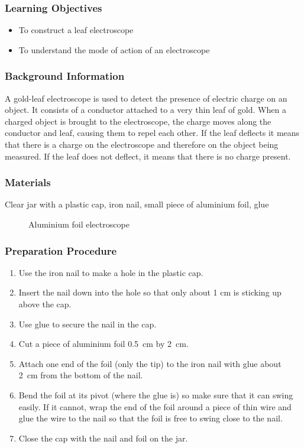 \subsubsection*{Learning Objectives}
\begin{itemize}
\item{To construct a leaf electroscope} 
\item{To understand the mode of action of an electroscope} 
\end{itemize}

\subsubsection*{Background Information}
A gold-leaf electroscope is used to detect the presence of electric charge on an object. It consists of a conductor attached to a very thin leaf of gold. When a charged object is brought to the electroscope, the charge moves along the conductor and leaf, causing them to repel each other. If the leaf deflects it means that there is a charge on the electroscope and therefore on the object being measured. If the leaf does not deflect, it means that there is no charge present. 

\subsubsection*{Materials}
Clear jar with a plastic cap, iron nail, small piece of aluminium foil, glue

\begin{figure}[h!]
\begin{center}
\def\svgwidth{200pt}

\caption{Aluminium foil electroscope}
\label{fig:al-leaf-electroscope}
\end{center}
\end{figure}

\subsubsection*{Preparation Procedure}
\begin{enumerate}
\item{Use the iron nail to make a hole in the plastic cap.} 
\item{Insert the nail down into the hole so that only about 1 cm is sticking up above the cap.} 
\item{Use glue to secure the nail in the cap.} 
\item{Cut a piece of aluminium foil 0.5~cm by 2~cm.} 
\item{Attach one end of the foil (only the tip) to the iron nail with glue about 2~cm from the bottom of the nail.} 
\item{Bend the foil at its pivot (where the glue is) so make sure that it can swing easily. If it cannot, wrap the end of the foil around a piece of thin wire and glue the wire to the nail so that the foil is free to swing close to the nail.} 
\item{Close the cap with the nail and foil on the jar.} 
\end{enumerate}

